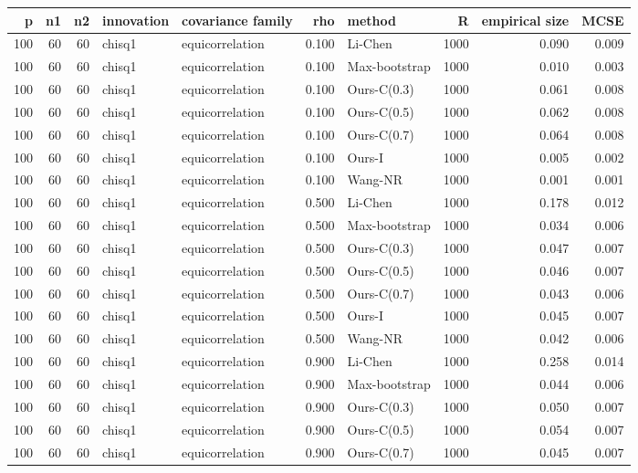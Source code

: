 \begin{tabular}{rrrllrlrrr}
\toprule
p & n1 & n2 & innovation & covariance family & rho & method & R & empirical size & MCSE \\
\midrule
100 & 60 & 60 & chisq1 & equicorrelation & 0.100 & Li-Chen & 1000 & 0.090 & 0.009 \\
100 & 60 & 60 & chisq1 & equicorrelation & 0.100 & Max-bootstrap & 1000 & 0.010 & 0.003 \\
100 & 60 & 60 & chisq1 & equicorrelation & 0.100 & Ours-C(0.3) & 1000 & 0.061 & 0.008 \\
100 & 60 & 60 & chisq1 & equicorrelation & 0.100 & Ours-C(0.5) & 1000 & 0.062 & 0.008 \\
100 & 60 & 60 & chisq1 & equicorrelation & 0.100 & Ours-C(0.7) & 1000 & 0.064 & 0.008 \\
100 & 60 & 60 & chisq1 & equicorrelation & 0.100 & Ours-I & 1000 & 0.005 & 0.002 \\
100 & 60 & 60 & chisq1 & equicorrelation & 0.100 & Wang-NR & 1000 & 0.001 & 0.001 \\
100 & 60 & 60 & chisq1 & equicorrelation & 0.500 & Li-Chen & 1000 & 0.178 & 0.012 \\
100 & 60 & 60 & chisq1 & equicorrelation & 0.500 & Max-bootstrap & 1000 & 0.034 & 0.006 \\
100 & 60 & 60 & chisq1 & equicorrelation & 0.500 & Ours-C(0.3) & 1000 & 0.047 & 0.007 \\
100 & 60 & 60 & chisq1 & equicorrelation & 0.500 & Ours-C(0.5) & 1000 & 0.046 & 0.007 \\
100 & 60 & 60 & chisq1 & equicorrelation & 0.500 & Ours-C(0.7) & 1000 & 0.043 & 0.006 \\
100 & 60 & 60 & chisq1 & equicorrelation & 0.500 & Ours-I & 1000 & 0.045 & 0.007 \\
100 & 60 & 60 & chisq1 & equicorrelation & 0.500 & Wang-NR & 1000 & 0.042 & 0.006 \\
100 & 60 & 60 & chisq1 & equicorrelation & 0.900 & Li-Chen & 1000 & 0.258 & 0.014 \\
100 & 60 & 60 & chisq1 & equicorrelation & 0.900 & Max-bootstrap & 1000 & 0.044 & 0.006 \\
100 & 60 & 60 & chisq1 & equicorrelation & 0.900 & Ours-C(0.3) & 1000 & 0.050 & 0.007 \\
100 & 60 & 60 & chisq1 & equicorrelation & 0.900 & Ours-C(0.5) & 1000 & 0.054 & 0.007 \\
100 & 60 & 60 & chisq1 & equicorrelation & 0.900 & Ours-C(0.7) & 1000 & 0.045 & 0.007 \\

\end{tabular}
